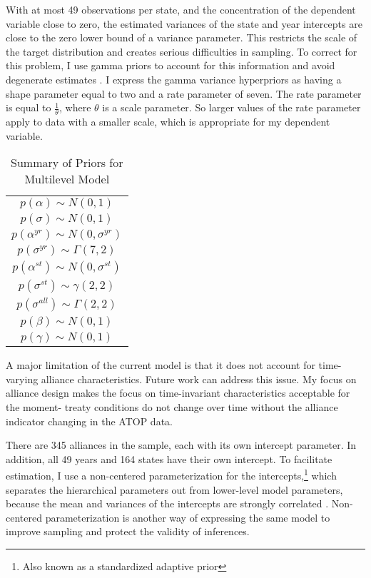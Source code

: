 \documentclass[12pt]{article}
\begin{document}
With at most 49 observations per state, and the concentration of the dependent variable close to zero, the estimated variances of the state and year intercepts are close to the zero lower bound of a variance parameter. This restricts the scale of the target distribution and creates serious difficulties in sampling. To correct for this problem, I use gamma priors to account for this information and avoid degenerate estimates \citep{Chungetal2013}. I express the gamma variance hyperpriors as having a shape parameter equal to two and a rate parameter of seven. The rate parameter is equal to $\frac{1}{\theta}$, where $\theta$ is a scale parameter. So larger values of the rate parameter apply to data with a smaller scale, which is appropriate for my dependent variable. 


\begin{table} %

 \begin{center}
\begin{tabular}{c} 
$ p(\alpha) \sim N(0, 1)$  \\
$ p(\sigma) \sim N(0, 1) $ \\
$ p(\alpha^{yr}) \sim N(0, \sigma^{yr}) $ \\ 
$ p(\sigma^{yr}) \sim \Gamma(7, 2) $ \\
$ p(\alpha^{st}) \sim N(0, \sigma^{st}) $ \\ 
$ p(\sigma^{st}) \sim \gamma(2, 2) $ \\ 
$ p(\sigma^{all}) \sim \Gamma(2, 2) $ \\
$ p(\beta) \sim N(0, 1) $\\
$ p(\gamma) \sim N(0, 1) $ 
\end{tabular} 
\end{center} 

\caption{Summary of Priors for Multilevel Model}
\label{tab:priors}
\end{table} 

A major limitation of the current model is that it does not account for time-varying alliance characteristics. Future work can address this issue. My focus on alliance design makes the focus on time-invariant characteristics acceptable for the moment- treaty conditions do not change over time without the alliance indicator changing in the ATOP data. 

There are 345 alliances in the sample, each with its own intercept parameter. In addition, all 49 years and 164 states have their own intercept. To facilitate estimation, I use a non-centered parameterization for the intercepts,\footnote{Also known as a standardized adaptive prior} which separates the hierarchical parameters out from lower-level model parameters, because the mean and variances of the intercepts are strongly correlated \citep{BetancourtGirolani2015, McElreath2016}. Non-centered parameterization is another way of expressing the same model to improve sampling and protect the validity of inferences. 














  
% 
\end{document}

